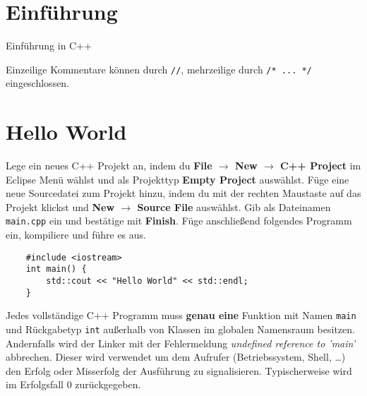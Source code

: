 

\newcommand{\exday}{1}

\cppSetTitle
\setcounter{section}{-1}



\cppSetHeaderAndMakeTitle

\section*{Einführung}
Einführung in C++

Einzeilige Kommentare können durch \texttt{//}, mehrzeilige durch \texttt{/* ... */} eingeschlossen.


\section{Hello World}
Lege ein neues C++ Projekt an, indem du \textbf{File $\rightarrow$ New $\rightarrow$ C++ Project} im Eclipse Menü wählst und als Projekttyp \textbf{Empty Project} auswählst.
Füge eine neue Sourcedatei zum Projekt hinzu, indem du mit der rechten Maustaste auf das Projekt klickst und \textbf{New $\rightarrow$ Source File} auswählst.
Gib als Dateinamen \texttt{main.cpp} ein und bestätige mit \textbf{Finish}.
Füge anschließend folgendes Programm ein, kompiliere und führe es aus.
\begin{lstlisting}
	#include <iostream>
	int main() {
		std::cout << "Hello World" << std::endl;
	}
\end{lstlisting}

Jedes vollständige C++ Programm muss \textbf{genau eine} Funktion mit Namen \texttt{main} und Rückgabetyp \texttt{int} außerhalb von Klassen im globalen Namensraum besitzen. Andernfalls wird der Linker mit der Fehlermeldung \emph{undefined reference to 'main'} abbrechen.
Dieser wird verwendet um dem Aufrufer (Betriebssystem, Shell, \dots) den Erfolg oder Misserfolg der Ausführung zu signalisieren.
Typischerweise wird im Erfolgsfall 0 zurückgegeben.

